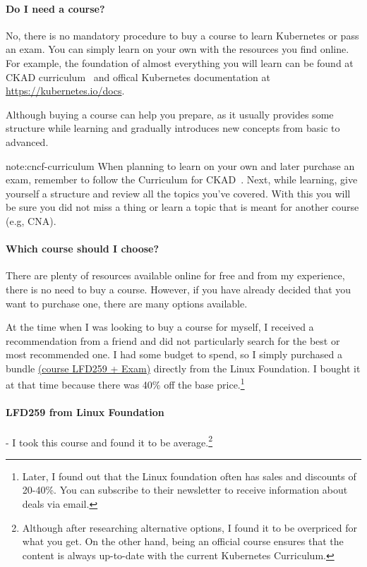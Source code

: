 \paragraph{Do I need a course?} No, there is no mandatory procedure to buy a course to learn Kubernetes or pass an exam. You can simply learn on your own with the resources you find online. For example, the foundation of almost everything you will learn can be found at CKAD curriculum~\cite{cncf-curriculum} and offical Kubernetes documentation at \href{https://kubernetes.io/docs}{https://kubernetes.io/docs}.

Although buying a course can help you prepare, as it usually provides some structure while learning and gradually introduces new concepts from basic to advanced.

\begin{note}{note:cncf-curriculum}
	When planning to learn on your own and later purchase an exam, remember to follow the Curriculum for CKAD~\cite{cncf-curriculum}. Next, while learning, give yourself a structure and review all the topics you've covered. With this you will be sure you did not miss a thing or learn a topic that is meant for another course (e.g, CNA).
\end{note}


\paragraph{Which course should I choose?} There are plenty of resources available online for free and from my experience, there is no need to buy a course. However, if you have already decided that you want to purchase one, there are many options available.

At the time when I was looking to buy a course for myself, I received a recommendation from a friend and did not particularly search for the best or most recommended one. I had some budget to spend, so I simply purchased a bundle \href{https://trainingportal.linuxfoundation.org/collections/kubernetes-developer}{(course LFD259 + Exam)} directly from the Linux Foundation. I bought it at that time because there was 40\% off the base price.\footnote{Later, I found out that the Linux foundation often has sales and discounts of 20-40\%. You can subscribe to their newsletter to receive information about deals via email.}


\paragraph{LFD259 from Linux Foundation} - I took this course and found it to be average.\footnote{Although after researching alternative options, I found it to be overpriced for what you get. On the other hand, being an official course ensures that the content is always up-to-date with the current Kubernetes Curriculum.}

